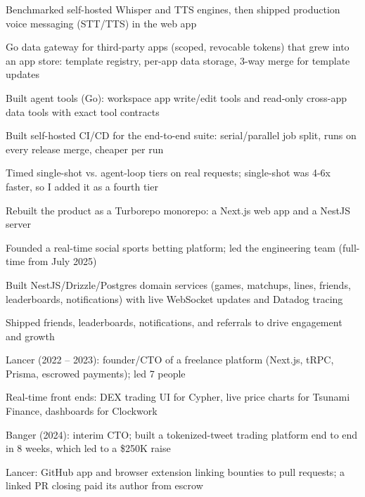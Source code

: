 \documentclass[print]{jack-resume}
\begin{document}
\begin{tightemize}
    \item Benchmarked self-hosted Whisper and TTS engines, then shipped production voice messaging (STT/TTS) in the web app
    \item Go data gateway for third-party apps (scoped, revocable tokens) that grew into an app store: template registry, per-app data storage, 3-way merge for template updates
    \item Built agent tools (Go): workspace app write/edit tools and read-only cross-app data tools with exact tool contracts
    \item Built self-hosted CI/CD for the end-to-end suite: serial/parallel job split, runs on every release merge, cheaper per run
    \item Timed single-shot vs. agent-loop tiers on real requests; single-shot was 4-6x faster, so I added it as a fourth tier
\end{tightemize}
\sectionsep

\begin{tightemize}
    \item Rebuilt the product as a Turborepo monorepo: a Next.js web app and a NestJS server
    \item Founded a real-time social sports betting platform; led the engineering team (full-time from July 2025)
    \item Built NestJS/Drizzle/Postgres domain services (games, matchups, lines, friends, leaderboards, notifications) with live WebSocket updates and Datadog tracing
    \item Shipped friends, leaderboards, notifications, and referrals to drive engagement and growth
\end{tightemize}
\sectionsep

\begin{tightemize}
    \item Lancer (2022 -- 2023): founder/CTO of a freelance platform (Next.js, tRPC, Prisma, escrowed payments); led 7 people
    \item Real-time front ends: DEX trading UI for Cypher, live price charts for Tsunami Finance, dashboards for Clockwork
    \item Banger (2024): interim CTO; built a tokenized-tweet trading platform end to end in 8 weeks, which led to a \$250K raise
    \item Lancer: GitHub app and browser extension linking bounties to pull requests; a linked PR closing paid its author from escrow
\end{tightemize}
\sectionsep
\end{document}
